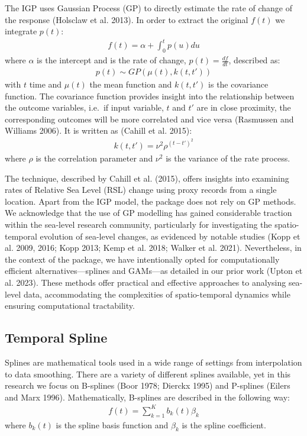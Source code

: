 The IGP uses Gaussian Process (GP) to directly estimate the rate of change of the response (Holsclaw et al. 2013). In order to extract the original \(f(t)\) we integrate \(p(t)\):
\begin{align}
    f(t) = \alpha + \int^t_0p(u)du
\end{align}
where \(\alpha\) is the intercept and is the rate of change, \(p(t) = \frac{df}{dt}\), described as:
\begin{align}
    p(t) \sim GP(\mu(t),k(t,t'))
\end{align}
with \(t\) time and \(\mu(t)\) the mean function and \(k(t,t')\) is the covariance function. The covariance function provides insight into the relationship between the outcome variables, i.e.~if input variable, \(t\) and \(t'\) are in close proximity, the corresponding outcomes will be more correlated and vice versa (Rasmussen and Williams 2006). It is written as (Cahill et al. 2015):
\begin{align} 
    k(t,t') = \nu^2\rho^{(t-t')^2}
\end{align}
where \(\rho\) is the correlation parameter and \(\nu^2\) is the variance of the rate process.

The technique, described by Cahill et al. (2015), offers insights into examining rates of Relative Sea Level (RSL) change using proxy records from a single location. Apart from the IGP model, the  package does not rely on GP methods. We acknowledge that the use of GP modelling has gained considerable traction within the sea-level research community, particularly for investigating the spatio-temporal evolution of sea-level changes, as evidenced by notable studies (Kopp et al. 2009, 2016; Kopp 2013; Kemp et al. 2018; Walker et al. 2021). Nevertheless, in the context of the  package, we have intentionally opted for computationally efficient alternatives---splines and GAMs---as detailed in our prior work (Upton et al. 2023). These methods offer practical and effective approaches to analysing sea-level data, accommodating the complexities of spatio-temporal dynamics while ensuring computational tractability.

\hypertarget{temporalspline}{%
\subsection{Temporal Spline}\label{temporalspline}}

Splines are mathematical tools used in a wide range of settings from interpolation to data smoothing. There are a variety of different splines available, yet in this research we focus on B-splines (Boor 1978; Dierckx 1995) and P-splines (Eilers and Marx 1996). Mathematically, B-splines are described in the following way:
\begin{align}
    f(t) = \sum^K_{k=1} b_k(t) \beta_k 
\end{align}
where \(b_k(t)\) is the spline basis function and \(\beta_k\) is the spline coefficient.

